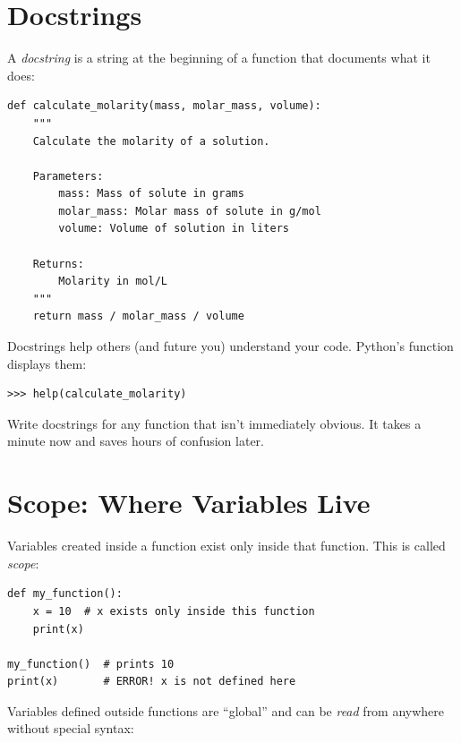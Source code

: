 \section{Docstrings}
\label{sec:docstrings}

A \emph{docstring} is a string at the beginning of a function that documents what it does:

\begin{lstlisting}
def calculate_molarity(mass, molar_mass, volume):
    """
    Calculate the molarity of a solution.

    Parameters:
        mass: Mass of solute in grams
        molar_mass: Molar mass of solute in g/mol
        volume: Volume of solution in liters

    Returns:
        Molarity in mol/L
    """
    return mass / molar_mass / volume
\end{lstlisting}

Docstrings help others (and future you) understand your code. Python's  function displays them:

\begin{lstlisting}
>>> help(calculate_molarity)
\end{lstlisting}

\begin{tip}
Write docstrings for any function that isn't immediately obvious. It takes a minute now and saves hours of confusion later.
\end{tip}

\section{Scope: Where Variables Live}
\label{sec:scope}

Variables created inside a function exist only inside that function. This is called \emph{scope}:

\begin{lstlisting}
def my_function():
    x = 10  # x exists only inside this function
    print(x)

my_function()  # prints 10
print(x)       # ERROR! x is not defined here
\end{lstlisting}

Variables defined outside functions are ``global'' and can be \emph{read} from anywhere without special syntax:

